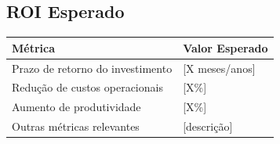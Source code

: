 \vskip 1cm

\subsection{ROI Esperado}

\bigskip

\begin{tabular}{|l|l|}
    \hline
    \textbf{Métrica} & \textbf{Valor Esperado} \\
    \hline
    Prazo de retorno do investimento & [X meses/anos] \\
    \hline
    Redução de custos operacionais & [X\%] \\
    \hline
    Aumento de produtividade & [X\%] \\
    \hline
    Outras métricas relevantes & [descrição] \\
    \hline
\end{tabular}

\bigskip
